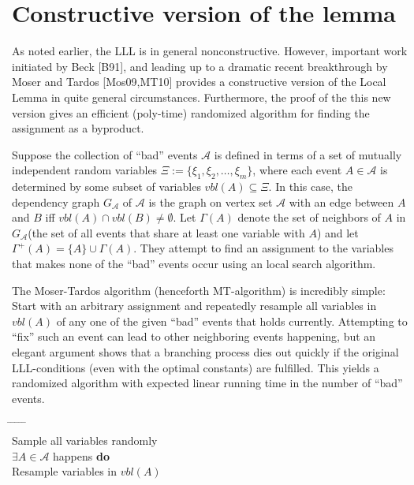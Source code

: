 \documentclass[twoside]{article}
\begin{document}
\section{Constructive version of the lemma}

As noted earlier, the LLL is in general nonconstructive. However, important work initiated by Beck [B91], and leading up to a dramatic recent breakthrough by Moser and Tardos [Mos09,MT10] provides a constructive version of the Local Lemma in quite general circumstances. Furthermore, the proof of the this new version gives an efficient (poly-time) randomized algorithm for finding the assignment as a byproduct.

Suppose the collection of ``bad'' events $\mathcal{A}$ is defined in terms of a set of mutually independent random variables $\Xi:=\{\xi_1,\xi_2,\dots,\xi_m\}$, where each event $A\in \mathcal{A}$ is determined by some subset of variables $vbl(A)\subseteq\Xi$.  In this case, the dependency graph $G_{\mathcal{A}}$ of $\mathcal{A}$ is the graph on vertex set $\mathcal{A}$ with an edge between $A$ and $B$ iff $vbl(A)\cap vbl(B)\not=\emptyset$. Let $\Gamma(A)$ denote the set of neighbors of $A$ in $G_{\mathcal{A}}$(the set of all events that share at least one variable with $A$) and let $\Gamma^+(A)=\{A\}\cup\Gamma(A)$. They attempt to find an assignment to the variables that makes none of the ``bad'' events occur using an local search algorithm. 

The Moser-Tardos algorithm (henceforth MT-algorithm) is incredibly simple: Start with an arbitrary assignment and repeatedly resample all variables in $vbl(A)$ of any one of the given ``bad'' events that holds currently.  Attempting to ``fix'' such an event can lead to other neighboring events happening, but an elegant argument shows that a branching process dies out quickly if the original LLL-conditions (even with the optimal constants) are fulfilled. This yields a randomized algorithm with expected linear running time in the number of ``bad'' events.

\begin{tabbing}
\hspace*{.25in} \= \hspace*{.25in} \= \hspace*{.25in} \= \hspace*{.25in} \= \hspace*{.25in} \=\kill
{} \\
\> Sample all variables randomly \\
  $\exists A\in\mathcal{A}$ happens {\bf do}\\
\>\> Resample variables in $vbl(A)$ \\
\end{tabbing}
\end{document}
